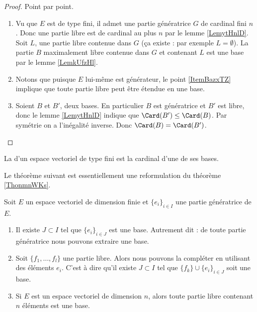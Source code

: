 \begin{proof}
    Point par point.
    \begin{enumerate}
        \item
    Vu que \( E\) est de type fini, il admet une partie génératrice \( G\) de cardinal fini \( n\). Donc une partie libre est de cardinal au plus \( n\) par le lemme \ref{LemytHnlD}. Soit \( L\), une partie libre contenue dans \( G\) (ça existe : par exemple \( L=\emptyset\)). La partie \( B\) maximalement libre contenue dans \( G\) et contenant \( L\) est une base par le lemme \ref{LemkUfzHl}.
\item
Notons que puisque \( E\) lui-même est générateur, le point \ref{ItemBazxTZ} implique que toute partie libre peut être étendue en une base.
\item
    Soient \( B\) et \( B'\), deux bases. En particulier \( B\) est génératrice et \( B'\) est libre, donc le lemme \ref{LemytHnlD} indique que \( \Card(B')\leq \Card(B)\). Par symétrie on a l'inégalité inverse. Donc \( \Card(B)=\Card(B')\).
    \end{enumerate}
\end{proof}

\begin{definition}
    La  d'un espace vectoriel de type fini est la cardinal d'une de ses bases.
\end{definition}

Le théorème suivant est essentiellement une reformulation du théorème \ref{ThonmnWKs}.
\begin{theorem} \label{ThoBaseIncompjblieG}     \label{ThoMGQZooIgrXjy}
    Soit \( E\) un espace vectoriel de dimension finie et \( \{ e_i \}_{i\in I}\) une partie génératrice de \( E\).

    \begin{enumerate}
        \item
            Il existe \( J\subset I\) tel que \( \{ e_i \}_{i\in J}\) est une base. Autrement dit : de toute partie génératrice nous pouvons extraire une base.
        \item
            Soit \( \{ f_1,\ldots, f_l \}\) une partie libre. Alors nous pouvons la compléter en utilisant des éléments \( e_i\). C'est à dire qu'il existe \( J\subset I\) tel que \( \{ f_k \}\cup\{ e_i \}_{i\in J}\) soit une base.
        \item       \label{ItemHIVAooPnTlsBi}
            Si \( E\) est un espace vectoriel de dimension \( n\), alors toute partie libre contenant \( n\) éléments est une base.
    \end{enumerate}
\end{theorem}

